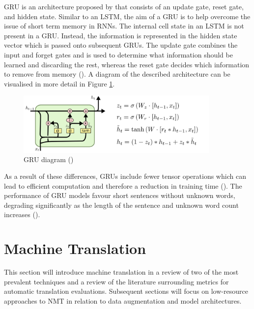 \acrfull{GRU} is an architecture proposed by \cite{cho_properties_2014} that consists of an update gate, reset gate, and hidden state. Similar to an \acrshort{LSTM}, the aim of a \acrshort{GRU} is to help overcome the issue of short term memory in \acrshort{RNN}s.
The internal cell state in an \acrshort{LSTM} is not present in a \acrshort{GRU}. Instead, the information is represented in the hidden state vector which is passed onto subsequent \acrshort{GRU}s.
The update gate combines the input and forget gates and is used to determine what information should be learned and discarding the rest, whereas the reset gate decides which information to remove from memory (\cite{gao_gru_2016}).
A diagram of the described architecture can be visualised in more detail in Figure \ref{fig:rnn_gru}.
\begin{figure}[ht!]
\centering
\includegraphics[width=0.89\textwidth]{media/literature/machine_learning/ml_rnn_gru.png}
\caption[Diagram of Gated Recurrent Unit]{\acrfull{GRU} diagram (\cite{colah_lstm_2019})}
\label{fig:rnn_gru}
\end{figure}


As a result of these differences, \acrshort{GRU}s include fewer tensor operations which can lead to efficient computation and therefore a reduction in training time (\cite{chung_gru_2014}).
The performance of \acrshort{GRU} models favour short sentences without unknown words, degrading significantly as the length of the sentence and unknown word count increases (\cite{cho_properties_2014}).


\section{Machine Translation}
\label{Machine Translation}

This section will introduce machine translation in a review of two of the most prevalent techniques and a review of the literature surrounding metrics for automatic translation evaluations. Subsequent sections will focus on low-resource approaches to \acrshort{NMT} in relation to data augmentation and model architectures.

